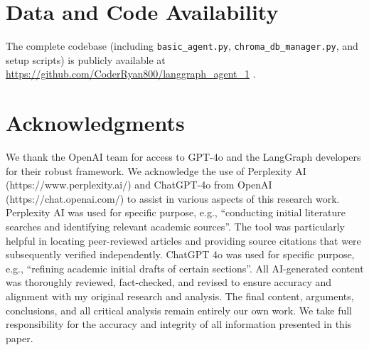 \documentclass[conference]{IEEEtran}
\begin{document}
\section*{Data and Code Availability}
The complete codebase (including \texttt{basic\_agent.py}, 
\texttt{chroma\_db\_manager.py}, and setup scripts) is 
publicly available at \url{https://github.com/CoderRyan800/langgraph_agent_1} \cite{LangGraphAgent2025}.


\section*{Acknowledgments}
We thank the OpenAI team for  access to GPT-4o and the LangGraph developers for their robust framework.
We acknowledge the use of Perplexity AI (https://www.perplexity.ai/) and ChatGPT-4o from OpenAI
(https://chat.openai.com/) to assist in various aspects of this research work.
Perplexity AI was used for specific purpose, e.g., “conducting initial literature searches 
and identifying relevant academic sources”. The tool was particularly helpful in 
locating peer-reviewed articles and providing source citations that were subsequently verified independently.
ChatGPT 4o was used for specific purpose, e.g., “refining academic initial drafts 
of certain sections”. All AI-generated content was thoroughly reviewed, fact-checked, 
and revised to ensure accuracy and alignment with my original research and analysis.
The final content, arguments, conclusions, and all critical analysis remain 
entirely our own work. We take full responsibility for the accuracy and integrity 
of all information presented in this paper.



\end{document}

